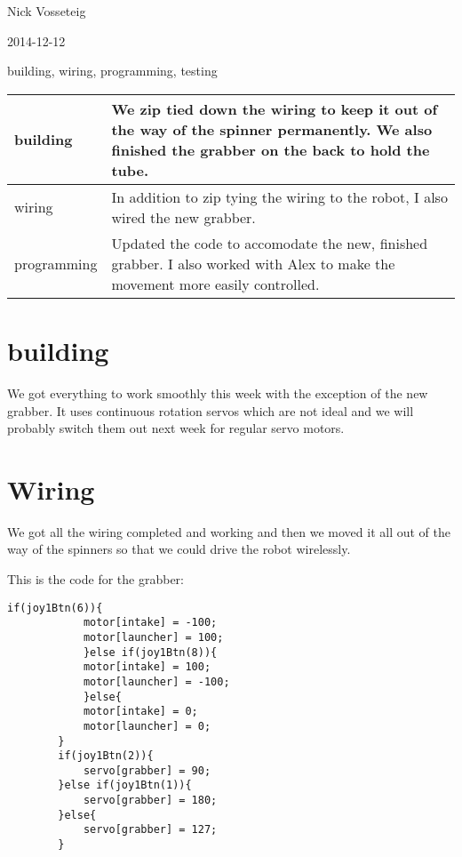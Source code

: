 Nick Vosseteig

2014-12-12

building, wiring, programming, testing

\begin{tabular}{|p{5cm}|p{5cm}|}
 \hline
 building&
We zip tied down the wiring to keep it out of the way of the spinner permanently. We also finished the grabber on the back to hold the tube. 
 \\
 \hline
wiring&
In addition to zip tying the wiring to the robot, I also wired the new grabber. 
 \\
 \hline
programming&
Updated the code to accomodate the new, finished grabber. I also worked with Alex to make the movement more easily controlled.
 \\
 \hline
\end{tabular}

\section*{building}
We got everything to work smoothly this week with the exception of the new grabber. It uses continuous rotation servos which are not ideal and we will probably switch them out next week for regular servo motors.
\section*{Wiring}
We got all the wiring completed and working and then we moved it all out of the way of the spinners so that we could drive the robot wirelessly.

This is the code for the grabber:
\begin{lstlisting}[style = RobotC]	
		if(joy1Btn(6)){
			motor[intake] = -100;
			motor[launcher] = 100;
			}else if(joy1Btn(8)){
			motor[intake] = 100;
			motor[launcher] = -100;
			}else{
			motor[intake] = 0;
			motor[launcher] = 0;
		}
		if(joy1Btn(2)){
			servo[grabber] = 90;
		}else if(joy1Btn(1)){
			servo[grabber] = 180;
		}else{
			servo[grabber] = 127;
		}
\end{lstlisting}
